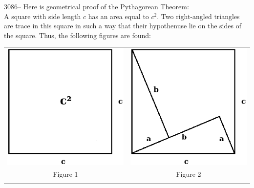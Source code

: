 \documentclass[letterpaper, 12pt]{article}
\begin{document}
3086-- Here is geometrical proof of the Pythagorean Theorem:\\
A square with side length $c$ has an area equal to $c^{2}$. Two right-angled triangles are trace in this square in such a way that their hypothenuse lie on the sides of the square. Thus, the following figures are found:
\begin{center}
\begin{tabular}{c c}
\includegraphics[scale=0.35]{carrec2.eps} & \includegraphics[scale=0.35]{pythagore2.eps}\\
{\small Figure 1} & {\small Figure 2} \\
 & \\
\end{tabular}
\end{center}
\end{document}

